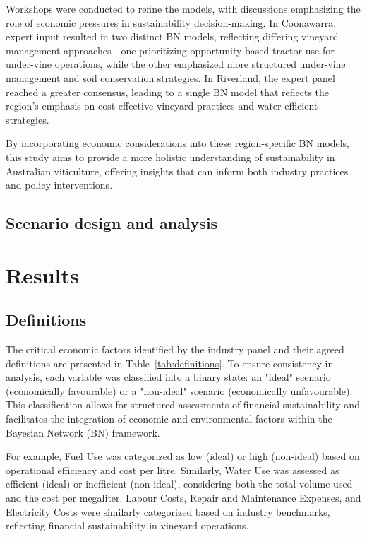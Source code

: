 \documentclass{article}
\begin{document}
Workshops were conducted to refine the models, with discussions emphasizing the role of economic pressures in sustainability decision-making. In Coonawarra, expert input resulted in two distinct BN models, reflecting differing vineyard management approaches—one prioritizing opportunity-based tractor use for under-vine operations, while the other emphasized more structured under-vine management and soil conservation strategies. In Riverland, the expert panel reached a greater consensus, leading to a single BN model that reflects the region’s emphasis on cost-effective vineyard practices and water-efficient strategies.

By incorporating economic considerations into these region-specific BN models, this study aims to provide a more holistic understanding of sustainability in Australian viticulture, offering insights that can inform both industry practices and policy interventions.

\subsection{Scenario design and analysis}

\section{Results}

\subsection{Definitions}

The critical economic factors identified by the industry panel and their agreed definitions are presented in Table~\ref{tab:definitions}. To ensure consistency in analysis, each variable was classified into a binary state: an "ideal" scenario (economically favourable) or a "non-ideal" scenario (economically unfavourable). This classification allows for structured assessments of financial sustainability and facilitates the integration of economic and environmental factors within the Bayesian Network (BN) framework.

For example, Fuel Use was categorized as low (ideal) or high (non-ideal) based on operational efficiency and cost per litre. Similarly, Water Use was assessed as efficient (ideal) or inefficient (non-ideal), considering both the total volume used and the cost per megaliter. Labour Costs, Repair and Maintenance Expenses, and Electricity Costs were similarly categorized based on industry benchmarks, reflecting financial sustainability in vineyard operations.
\end{document}
